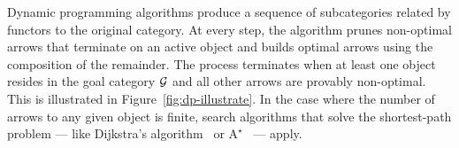 \documentclass[a4paper]{ifacconf}
\begin{document}
Dynamic programming algorithms produce a sequence of subcategories related by functors to the original category.
At every step, the algorithm prunes non-optimal arrows that terminate on an active object and builds optimal arrows using the composition of the remainder.
The process terminates when at least one object resides in the goal category \(\mathcal{G}\) and all other arrows are provably non-optimal.
This is illustrated in Figure~\ref{fig:dp-illustrate}.
In the case where the number of arrows to any given object is finite, search algorithms that solve the shortest-path problem --- like Dijkstra's algorithm~\citep{sniedovich_dijkstras_2006} or \(\text{A}^\star\)~\citep{4082128, martelli_dynamic_1975} --- apply.
%
\end{document}
